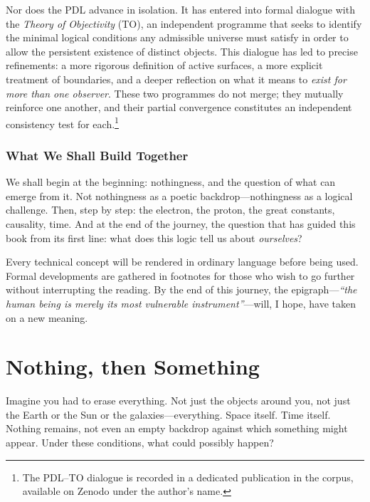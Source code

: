 \documentclass[12pt, a4paper, openright]{book}
\begin{document}
\medskip

Nor does the PDL advance in isolation. It has entered into formal dialogue with the \emph{Theory of Objectivity} (TO), an independent programme that seeks to identify the minimal logical conditions any admissible universe must satisfy in order to allow the persistent existence of distinct objects. This dialogue has led to precise refinements: a more rigorous definition of active surfaces, a more explicit treatment of boundaries, and a deeper reflection on what it means to \emph{exist for more than one observer}. These two programmes do not merge; they mutually reinforce one another, and their partial convergence constitutes an independent consistency test for each.\footnote{The PDL--TO dialogue is recorded in a dedicated publication in the corpus, available on Zenodo under the author's name.}

\subsection*{What We Shall Build Together}

We shall begin at the beginning: nothingness, and the question of what can emerge from it. Not nothingness as a poetic backdrop---nothingness as a logical challenge. Then, step by step: the electron, the proton, the great constants, causality, time. And at the end of the journey, the question that has guided this book from its first line: what does this logic tell us about \emph{ourselves}?

\medskip

Every technical concept will be rendered in ordinary language before being used. Formal developments are gathered in footnotes for those who wish to go further without interrupting the reading. By the end of this journey, the epigraph---\textit{``the human being is merely its most vulnerable instrument''}---will, I hope, have taken on a new meaning. 

\chapter{Nothing, then Something}

Imagine you had to erase everything. Not just the objects around you, not just the Earth or the Sun or the galaxies---everything. Space itself. Time itself. Nothing remains, not even an empty backdrop against which something might appear. Under these conditions, what could possibly happen?
\end{document}
